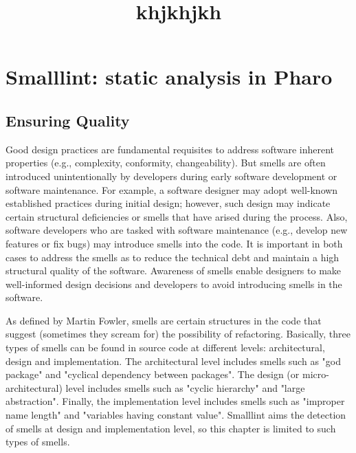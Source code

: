 \documentclass[a4paper,10pt,twoside]{book}
\title{khjkhjkh}
\begin{document}


\chapter{Smalllint: static analysis in Pharo}

\section{Ensuring Quality}

Good design practices are fundamental requisites to address software inherent properties (e.g., complexity, conformity, changeability).
But smells are often introduced unintentionally by developers during early software development or software maintenance.
For example, a software designer may adopt well-known established practices during initial design; however, such design may indicate certain structural deficiencies or smells that have arised during the process. 
Also, software developers who are tasked with software maintenance (e.g., develop new features or fix bugs) may introduce smells into the code. 
It is important in both cases to address the smells as to reduce the technical debt and maintain a high structural quality of the software.
Awareness of smells enable designers to make well-informed design decisions and developers to avoid introducing smells in the software. 

As defined by Martin Fowler, smells are certain structures in the code that suggest (sometimes they scream for) the possibility of refactoring.
Basically, three types of smells can be found in source code at different levels: architectural, design and implementation. The architectural level includes smells such as "god package" and "cyclical dependency between packages". The design (or micro-architectural) level includes smells such as "cyclic hierarchy" and "large abstraction". Finally, the implementation level includes smells such as "improper name length" and "variables having constant value". Smalllint aims the detection of smells at design and implementation level, so this chapter is limited to such types of smells.


\end{document}
